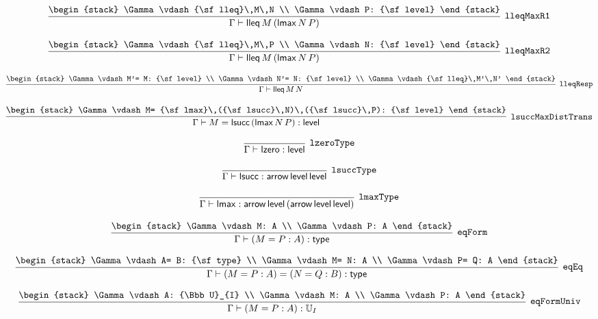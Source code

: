 \[
\infer[{\tt lleqMaxR1}]{\Gamma \vdash {\sf lleq}\,M\,({\sf lmax}\,N\,P)}{
\begin{stack}
\Gamma \vdash {\sf lleq}\,M\,N
\\
\Gamma \vdash P: {\sf level}
\end{stack}}
\]

\[
\infer[{\tt lleqMaxR2}]{\Gamma \vdash {\sf lleq}\,M\,({\sf lmax}\,N\,P)}{
\begin{stack}
\Gamma \vdash {\sf lleq}\,M\,P
\\
\Gamma \vdash N: {\sf level}
\end{stack}}
\]

\[
\infer[{\tt lleqResp}]{\Gamma \vdash {\sf lleq}\,M\,N}{
\begin{stack}
\Gamma \vdash M'= M: {\sf level}
\\
\Gamma \vdash N'= N: {\sf level}
\\
\Gamma \vdash {\sf lleq}\,M'\,N'
\end{stack}}
\]

\[
\infer[{\tt lsuccMaxDistTrans}]{\Gamma \vdash M= {\sf lsucc}\,({\sf lmax}\,N\,P): {\sf level}}{
\begin{stack}
\Gamma \vdash M= {\sf lmax}\,({\sf lsucc}\,N)\,({\sf lsucc}\,P): {\sf level}
\end{stack}}
\]

\[
\infer[{\tt lzeroType}]{\Gamma \vdash {\sf lzero}: {\sf level}}{}
\]

\[
\infer[{\tt lsuccType}]{\Gamma \vdash {\sf lsucc}: {\sf arrow}\,{\sf level}\,{\sf level}}{}
\]

\[
\infer[{\tt lmaxType}]{\Gamma \vdash {\sf lmax}: {\sf arrow}\,{\sf level}\,({\sf arrow}\,{\sf level}\,{\sf level})}{}
\]

\[
\infer[{\tt eqForm}]{\Gamma \vdash (M= P: A): {\sf type}}{
\begin{stack}
\Gamma \vdash M: A
\\
\Gamma \vdash P: A
\end{stack}}
\]

\[
\infer[{\tt eqEq}]{\Gamma \vdash (M= P: A)= (N= Q: B): {\sf type}}{
\begin{stack}
\Gamma \vdash A= B: {\sf type}
\\
\Gamma \vdash M= N: A
\\
\Gamma \vdash P= Q: A
\end{stack}}
\]

\[
\infer[{\tt eqFormUniv}]{\Gamma \vdash (M= P: A): {\Bbb U}_{I}}{
\begin{stack}
\Gamma \vdash A: {\Bbb U}_{I}
\\
\Gamma \vdash M: A
\\
\Gamma \vdash P: A
\end{stack}}
\]

